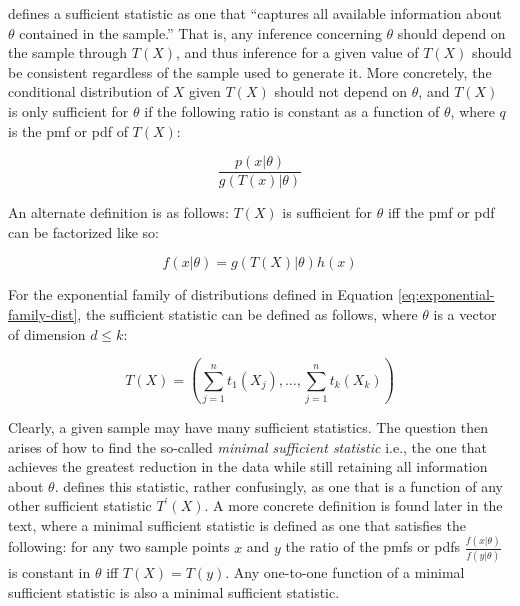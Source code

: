 \documentclass{report}
\begin{document}
\cite[Chapter~6.2]{casella_statistical_2002} defines a sufficient statistic as one that ``captures all available information about $\theta$ contained in the sample.'' That is, any inference concerning $\theta$ should depend on the sample through $T(X)$, and thus inference for a given value of $T(X)$ should be consistent regardless of the sample used to generate it. More concretely, the conditional distribution of $X$ given $T(X)$ should not depend on $\theta$, and $T(X)$ is only sufficient for $\theta$ if the following ratio is constant as a function of $\theta$, where $q$ is the \gls{pmf} or \gls{pdf} of $T(X)$:

\begin{equation}\label{eq:sufficient-stat}
    \frac{p(x|\theta)}{g(T(x)|\theta)}
\end{equation}

An alternate definition is as follows: $T(X)$ is sufficient for $\theta$ \gls{iff} the \gls{pmf} or \gls{pdf} can be factorized like so:

\begin{equation}\label{eq:pdf-pmf-factorization}
    f(x|\theta) = g(T(X)|\theta)h(x)
\end{equation}

For the exponential family of distributions defined in Equation \ref{eq:exponential-family-dist}, the sufficient statistic can be defined as follows, where $\theta$ is a vector of dimension $d \leq k$:

\begin{equation}\label{eq:sufficient-stat-exponential-family}
    T(X) = \left(\sum_{j=1}^n t_1(X_j), \dots, \sum_{j=1}^n t_k(X_k)\right)
\end{equation}

Clearly, a given sample may have many sufficient statistics. The question then arises of how to find the so-called \textit{minimal sufficient statistic} i.e., the one that achieves the greatest reduction in the data while still retaining all information about $\theta$. \cite[Chapter~6.2.2]{casella_statistical_2002} defines this statistic, rather confusingly, as one that is a function of any other sufficient statistic $T^\prime(X)$. A more concrete definition is found later in the text, where a minimal sufficient statistic is defined as one that satisfies the following: for any two sample points $x$ and $y$ the ratio of the \glspl{pmf} or \glspl{pdf} $\frac{f(x|\theta)}{f(y|\theta)}$ is constant in $\theta$ \gls{iff} $T(X) = T(y)$. Any one-to-one function of a minimal sufficient statistic is also a minimal sufficient statistic. 
\end{document}
